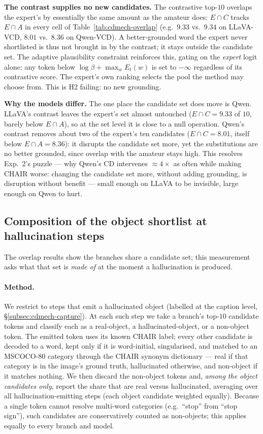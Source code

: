 \textbf{The contrast supplies no new candidates.} The contrastive top-$10$
overlaps the expert's by essentially the same amount as the amateur does:
$E\!\cap\!C$ tracks $E\!\cap\!A$ in every cell of Table~\ref{tab:cdmech-overlap}
(e.g.\ $9.33$ vs.\ $9.34$ on LLaVA-VCD, $8.01$ vs.\ $8.36$ on Qwen-VCD). A
better-grounded word the expert never shortlisted is thus not brought in by the
contrast; it stays outside the candidate set. The adaptive plausibility
constraint reinforces this, gating on the \emph{expert} logit alone: any token
below $\log\beta + \max_w E_t(w)$ is set to $-\infty$ regardless of its
contrastive score. The expert's own ranking selects the pool the method may
choose from. This is H2 failing: no new grounding.

\textbf{Why the models differ.} The one place the candidate set does move is
Qwen. LLaVA's contrast leaves the expert's set almost untouched
($E\!\cap\!C = 9.33$ of $10$, barely below $E\!\cap\!A$), so at the set level it
is close to a null operation. Qwen's contrast removes about two of the expert's
ten candidates ($E\!\cap\!C = 8.01$, itself below $E\!\cap\!A = 8.36$): it
disrupts the candidate set more, yet the substitutions are no better grounded,
since overlap with the amateur stays high. This resolves Exp.~2's puzzle --- why
Qwen's CD intervenes ${\approx}4\times$ as often while making CHAIR worse:
changing the candidate set more, without adding grounding, is disruption without
benefit --- small enough on LLaVA to be invisible, large enough on Qwen to
hurt.

\subsection{Composition of the object shortlist at hallucination steps}
\label{subsec:cdmech-res-shortlist}

The overlap results show the branches share a candidate set; this measurement
asks what that set is \emph{made of} at the moment a hallucination is produced.

\paragraph{Method.} We restrict to steps that emit a hallucinated object (labelled
at the caption level, \S\ref{subsec:cdmech-capture}). At each such step we take a
branch's top-$10$ candidate tokens and classify each as a real-object, a
hallucinated-object, or a non-object token. The emitted token uses its known
CHAIR label; every other candidate is decoded to a word, kept only if it is
word-initial, singularised, and matched to an MSCOCO-80 category through the
CHAIR synonym dictionary --- real if that category is in the image's ground
truth, hallucinated otherwise, and non-object if it matches nothing. We then
discard the non-object tokens and, \emph{among the object candidates only},
report the share that are real versus hallucinated, averaging over all
hallucination-emitting steps (each object candidate weighted equally). Because a
single token cannot resolve multi-word categories (e.g.\ ``stop'' from ``stop
sign''), such candidates are conservatively counted as non-objects; this applies
equally to every branch and model.

